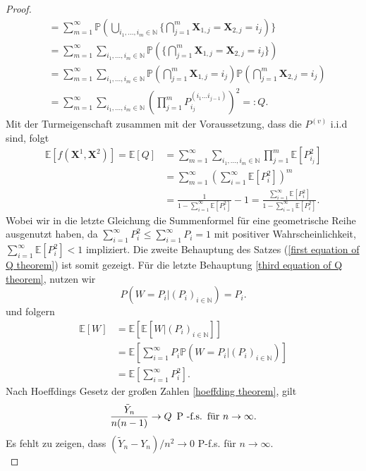 \begin{proof}
\begin{align}
&=\sum_{m=1}^{\infty}\mathbb{P}(\bigcup_{i_1,...,i_m \in \mathbb{N}} \{\bigcap_{j=1}^{m}\textbf{X}_{1,j}=\textbf{X}_{2,j} = i_j) \}   \nonumber\\
&=\sum_{m=1}^{\infty}\sum_{i_1,...,i_m \in \mathbb{N}}\mathbb{P}(\{\bigcap_{j=1}^{m}\textbf{X}_{1,j}=\textbf{X}_{2,j} = i_j \}) \nonumber\\
&=\sum_{m=1}^{\infty}\sum_{i_1,...,i_m \in \mathbb{N}}\mathbb{P}(\bigcap_{j=1}^{m}\textbf{X}_{1,j} = i_j )\mathbb{P}(\bigcap_{j=1}^{m}\textbf{X}_{2,j} = i_j ) \nonumber\\
&=\sum_{m=1}^{\infty}\sum_{i_1,...,i_m \in \mathbb{N}}(\prod_{j=1}^{m}P_{i_j}^{(i_1...i_{j-1})})^2 =: Q \label{Gleichungskette Tiefe}.
\end{align}
Mit der Turmeigenschaft zusammen mit der Voraussetzung, dass die $P^{(v)}$ i.i.d sind, folgt 
\begin{align}
\mathbb{E}[f(\textbf{X}^1,\textbf{X}^2) ] = \mathbb{E}[Q] &=\sum_{m=1}^{\infty}\sum_{i_1,...,i_m \in \mathbb{N}}\prod_{j=1}^{m}\mathbb{E}[P_{i_j}^{2}] \nonumber\\
 &= \sum_{m=1}^{\infty}(\sum_{i =1}^{\infty}\mathbb{E}[P_{i}^{2}])^m \nonumber \\
 &= \frac{1}{1- \sum_{i=1}^{\infty}\mathbb{E}[P_i^2]}-1  = \frac{\sum_{i=1}^{\infty}\mathbb{E}[P_i^2]}{1- \sum_{i=1}^{\infty}\mathbb{E}[P_i^2]}  \nonumber.
\end{align}
Wobei wir in die letzte Gleichung die Summenformel für eine geometrische Reihe ausgenutzt haben, da $\sum_{i=1}^{\infty} P_i^2 \leq \sum_{i=1}^{\infty} P_i = 1$ mit positiver Wahrscheinlichkeit, $\sum_{i=1}^{\infty} \mathbb{E}[P_i^2] < 1$ impliziert. Die zweite Behauptung des Satzes (\ref{first equation of Q theorem}) ist somit gezeigt. Für die letzte Behauptung \ref{third equation of Q theorem}, nutzen wir 
\[
    P(W=P_i|(P_i)_{i \in \mathbb{N}}) = P_i.  
\]  
und folgern
\begin{align}
\mathbb{E}[W] &= \mathbb{E}[\mathbb{E}[W|(P_i)_{i \in \mathbb{N}}]] \\
&= \mathbb{E}[\sum_{i=1}^{\infty}P_i\mathbb{P}(W = P_i|(P_i)_{i \in \mathbb{N}})] \\
&= \mathbb{E}[\sum_{i=1}^{\infty}P_i^2].
\end{align}
Nach Hoeffdings Gesetz der großen Zahlen \ref{hoeffding theorem}, gilt
\[
    \frac{\tilde{Y}_n}{n(n-1)} \rightarrow Q \hspace{5pt} \textnormal{P -f.s.} \hspace{5pt} \textnormal{für } n \to \infty.
\]
Es fehlt zu zeigen, dass $(\tilde{Y}_n-Y_n)/n^2 \rightarrow 0 $ P-f.s. für $n \to \infty$. \\

\end{proof}
